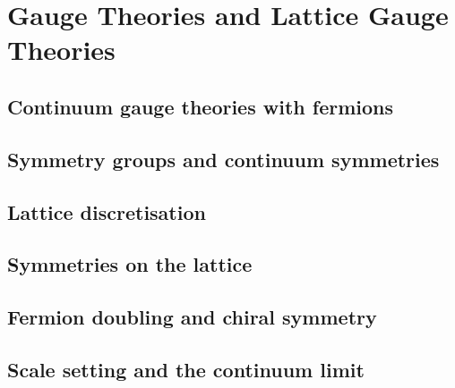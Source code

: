 \chapter{Gauge Theories and Lattice Gauge Theories}

\section{Continuum gauge theories with fermions}
\section{Symmetry groups and continuum symmetries}
\section{Lattice discretisation}
\section{Symmetries on the lattice}
\section{Fermion doubling and chiral symmetry}
\section{Scale setting and the continuum limit}
